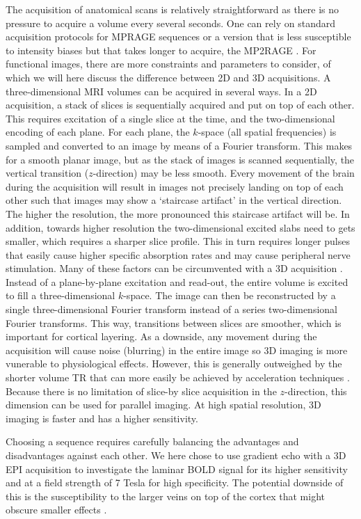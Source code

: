 The acquisition of anatomical scans is relatively straightforward as there is no pressure to acquire a volume every several seconds. One can rely on standard acquisition protocols for MPRAGE sequences \cite{Mugler1990} or a version that is less susceptible to intensity biases but that takes longer to acquire, the MP2RAGE \cite{Marques2010}. For functional images, there are more constraints and parameters to consider, of which we will here discuss the difference between 2D and 3D acquisitions. A three-dimensional MRI volumes can be acquired in several ways. In a 2D acquisition, a stack of slices is sequentially acquired and put on top of each other. This requires excitation of a single slice at the time, and the two-dimensional encoding of each plane. For each plane, the $k$-space (all spatial frequencies) is sampled and converted to an image by means of a Fourier transform. This makes for a smooth planar image, but as the stack of images is scanned sequentially, the vertical transition ($z$-direction) may be less smooth. Every movement of the brain during the acquisition will result in images not precisely landing on top of each other such that images may show a `staircase artifact' in the vertical direction. The higher the resolution, the more pronounced this staircase artifact will be. In addition, towards higher resolution the two-dimensional excited slabs need to gets smaller, which requires a sharper slice profile. This in turn requires longer pulses that easily cause higher specific absorption rates and may cause peripheral nerve stimulation. Many of these factors can be circumvented with a 3D acquisition \cite{Poser2010}. Instead of a plane-by-plane excitation and read-out, the entire volume is excited \cite{Song1994} to fill a three-dimensional $k$-space. The image can then be reconstructed by a single three-dimensional Fourier transform instead of a series two-dimensional Fourier transforms. This way, transitions between slices are smoother, which is important for cortical layering. As a downside, any movement during the acquisition will cause noise (blurring) in the entire image so 3D imaging is more vunerable to physiological effects. However, this is generally outweighed by the shorter volume TR that can more easily be achieved by acceleration techniques \cite{Poser2010}. Because there is no limitation of slice-by slice acquisition in the $z$-direction, this dimension can be used for parallel imaging. At high spatial resolution, 3D imaging is faster and has a higher sensitivity.

Choosing a sequence requires carefully balancing the advantages and disadvantages against each other. We here chose to use gradient echo with a 3D EPI acquisition to investigate the laminar BOLD signal for its higher sensitivity and at a field strength of 7 Tesla for high specificity. The potential downside of this is the susceptibility to the larger veins on top of the cortex that might obscure smaller effects \cite{Barth2007}. 

